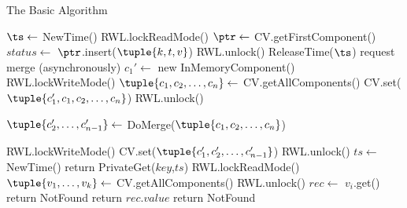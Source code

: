 

\begin{algorithm} [th!]
\small
\caption{\small  The Basic Algorithm}
\label{alg:client}

\begin{algorithmic}[1]
\makeatletter\setcounter{ALG@line}{0}\makeatother

     \State $\ts \gets$ NewTime()  \label{beginPut1}
     \State RWL.lockReadMode() 
     \State $\ptr \gets$ CV.getFirstComponent()     
     \State $status \gets$ $\ptr$.insert($\tuple{k,t,v}$)
     \State RWL.unlock()
     \State ReleaseTime($\ts$)
        \State request merge (asynchronously)
        \State {} 
     \EndIf
\EndProcedure
%
\vspace{7pt}
%
 
      \State $c_1' \gets$ new InMemoryComponent()
      \State RWL.lockWriteMode()
      \State $\tuple{c_1,c_2,\ldots,c_{n}} \gets$ CV.getAllComponents()
      \State CV.set($\tuple{c_1',c_1,c_2,\ldots,c_{n}}$)
      \State RWL.unlock()
      
      \State $\tuple{c_2',\ldots,c_{n-1}'} \gets$ DoMerge($\tuple{c_1,c_2,\ldots,c_{n}}$)
      
      \State RWL.lockWriteMode()
      \State CV.set($\tuple{c_1',c_2',\ldots,c_{n-1}'}$)      
      \State RWL.unlock()
\EndProcedure
%
\vspace{7pt}
%
    \State $ts    \gets$ NewTime()
    \State return PrivateGet($key$,$ts$)
\EndFunction
%
\vspace{7pt}
%
    \State RWL.lockReadMode() 
    \State $\tuple{v_1,\ldots,v_{k}} \gets$ CV.getAllComponents()
    \State RWL.unlock()
       \State $rec \gets$ $v_{i}$.get()
         \State return NotFound
         \State return $rec.value$
       \EndIf
    \EndFor
    \State return NotFound
\EndFunction
\end{algorithmic}
\end{algorithm}





